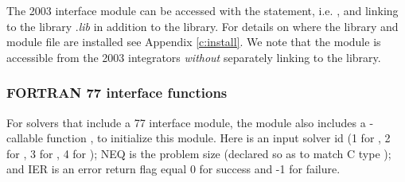 The {\F} 2003 {\nvecs} interface module can be accessed with the 
statement, i.e. , and linking to the library
.{\em lib} in addition to the {\CC} library.
For details on where the library and module file
 are installed see Appendix \ref{c:install}.
We note that the module is accessible from the {\F} 2003 {\sundials} integrators
\textit{without} separately linking to the
 library.

\subsubsection*{FORTRAN 77 interface functions}
For solvers that include a {\F} 77 interface module, the {\nvecs} module
also includes a {\F}-callable function ,
to initialize this {\nvecs} module.  Here  is an input solver id
(1 for {\cvode}, 2 for {\ida}, 3 for {\kinsol}, 4 for {\arkode}); NEQ is
the problem size (declared so as to match C type ); and
IER is an error return flag equal 0 for success and -1 for failure.
